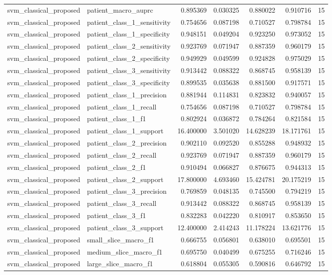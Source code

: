 \begin{tabular}{llrrrrr}
svm_classical_proposed & patient_macro_auprc & 0.895369 & 0.030325 & 0.880022 & 0.910716 & 15 \\
svm_classical_proposed & patient_class_1_sensitivity & 0.754656 & 0.087198 & 0.710527 & 0.798784 & 15 \\
svm_classical_proposed & patient_class_1_specificity & 0.948151 & 0.049204 & 0.923250 & 0.973052 & 15 \\
svm_classical_proposed & patient_class_2_sensitivity & 0.923769 & 0.071947 & 0.887359 & 0.960179 & 15 \\
svm_classical_proposed & patient_class_2_specificity & 0.949929 & 0.049599 & 0.924828 & 0.975029 & 15 \\
svm_classical_proposed & patient_class_3_sensitivity & 0.913442 & 0.088322 & 0.868745 & 0.958139 & 15 \\
svm_classical_proposed & patient_class_3_specificity & 0.899535 & 0.035638 & 0.881500 & 0.917571 & 15 \\
svm_classical_proposed & patient_class_1_precision & 0.881944 & 0.114831 & 0.823832 & 0.940057 & 15 \\
svm_classical_proposed & patient_class_1_recall & 0.754656 & 0.087198 & 0.710527 & 0.798784 & 15 \\
svm_classical_proposed & patient_class_1_f1 & 0.802924 & 0.036872 & 0.784264 & 0.821584 & 15 \\
svm_classical_proposed & patient_class_1_support & 16.400000 & 3.501020 & 14.628239 & 18.171761 & 15 \\
svm_classical_proposed & patient_class_2_precision & 0.902110 & 0.092520 & 0.855288 & 0.948932 & 15 \\
svm_classical_proposed & patient_class_2_recall & 0.923769 & 0.071947 & 0.887359 & 0.960179 & 15 \\
svm_classical_proposed & patient_class_2_f1 & 0.910494 & 0.066827 & 0.876675 & 0.944313 & 15 \\
svm_classical_proposed & patient_class_2_support & 17.800000 & 4.693460 & 15.424781 & 20.175219 & 15 \\
svm_classical_proposed & patient_class_3_precision & 0.769859 & 0.048135 & 0.745500 & 0.794219 & 15 \\
svm_classical_proposed & patient_class_3_recall & 0.913442 & 0.088322 & 0.868745 & 0.958139 & 15 \\
svm_classical_proposed & patient_class_3_f1 & 0.832283 & 0.042220 & 0.810917 & 0.853650 & 15 \\
svm_classical_proposed & patient_class_3_support & 12.400000 & 2.414243 & 11.178224 & 13.621776 & 15 \\
svm_classical_proposed & small_slice_macro_f1 & 0.666755 & 0.056801 & 0.638010 & 0.695501 & 15 \\
svm_classical_proposed & medium_slice_macro_f1 & 0.695750 & 0.040499 & 0.675255 & 0.716246 & 15 \\
svm_classical_proposed & large_slice_macro_f1 & 0.618804 & 0.055305 & 0.590816 & 0.646792 & 15 \\
\bottomrule
\end{tabular}
